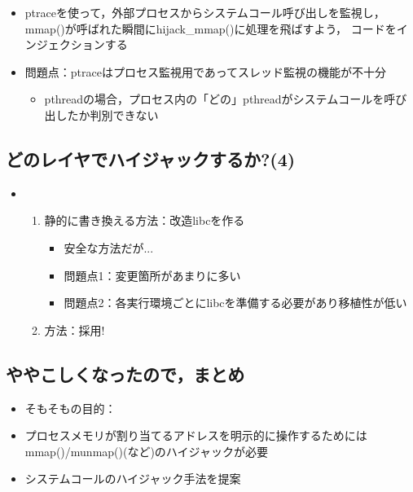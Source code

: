 \documentclass[25pt,papersize,landscape]{jsarticle}
\begin{document}
\begin{itemize}
\item ptraceを使って，外部プロセスからシステムコール呼び出しを監視し，
  mmap()が呼ばれた瞬間にhijack\_mmap()に処理を飛ばすよう，
  コードをインジェクションする
\item 問題点：ptraceはプロセス監視用であってスレッド監視の機能が不十分
  \begin{itemize}
  \item pthreadの場合，プロセス内の「どの」pthreadがシステムコールを呼び出したか判別できない
  \end{itemize}
\end{itemize}

\subsection{どのレイヤでハイジャックするか?(4)}


\begin{itemize}
\item {}
  \begin{enumerate}
  \item 静的に書き換える方法：改造libcを作る
    \begin{itemize}
    \item 安全な方法だが...
    \item 問題点1：変更箇所があまりに多い
    \item 問題点2：各実行環境ごとにlibcを準備する必要があり移植性が低い
    \end{itemize}
  \item {}方法：採用!
  \end{enumerate}
\end{itemize}


\subsection{ややこしくなったので，まとめ}

\begin{itemize}
\item そもそもの目的：
\item プロセスメモリが割り当てるアドレスを明示的に操作するためには
  mmap()/munmap()(など)のハイジャックが必要
\item {}システムコールのハイジャック手法を提案
\end{itemize}
\end{document}
